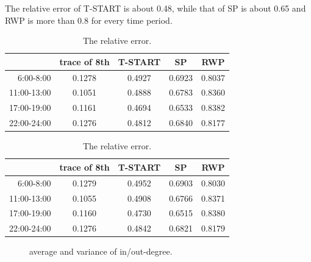 The relative error of T-START is about 0.48, while that of SP is about 0.65 and RWP is more than 0.8 for every time period.  
\begin{table}[!h]
\caption{The relative error.}\label{table_relative_err}
\centering
\begin{tabular}{r|c|c|c|c}
\hline
	&trace of 8th	&T-START &SP &RWP\\
\hline
 6:00-8:00&
0.1278&	0.4927&	0.6923&	0.8037\\ 
 11:00-13:00&
0.1051&	0.4888&	0.6783&	0.8360\\
 17:00-19:00&
0.1161&	0.4694&	0.6533&	0.8382\\
 22:00-24:00&
0.1276&	0.4812&	0.6840&	0.8177\\
\hline
\end{tabular}
\begin{tabular}{r|c|c|c|c}
\hline
	&trace of 8th	&T-START &SP&RWP\\
\hline
 6:00-8:00&
0.1279&	0.4952&	0.6903&	0.8030\\
 11:00-13:00&
0.1055&	0.4908&	0.6766&	0.8371\\
 17:00-19:00&
0.1160&	0.4730&	0.6515&	0.8380\\
 22:00-24:00&
0.1276&	0.4842&	0.6821&	0.8179\\
\hline
\end{tabular}
\end{table}
\begin{figure}[h]
\centering
{}
\caption{average and variance of in/out-degree.}\label{figure_avg}
\end{figure}
